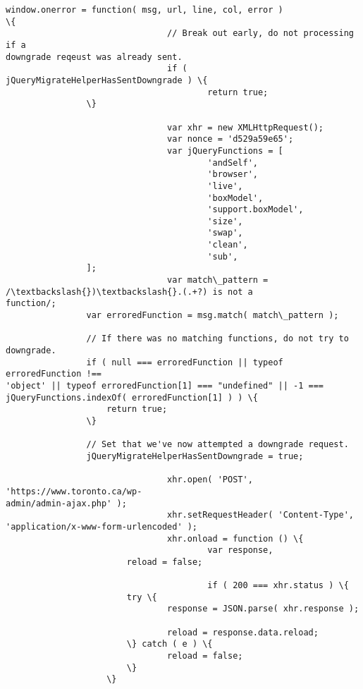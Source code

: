 \documentclass[11pt]{article}
\begin{document}
\begin{Verbatim}[commandchars=\\\{\}]
                        window.onerror = function( msg, url, line, col, error )
\{
                                // Break out early, do not processing if a
downgrade reqeust was already sent.
                                if ( jQueryMigrateHelperHasSentDowngrade ) \{
                                        return true;
                \}

                                var xhr = new XMLHttpRequest();
                                var nonce = 'd529a59e65';
                                var jQueryFunctions = [
                                        'andSelf',
                                        'browser',
                                        'live',
                                        'boxModel',
                                        'support.boxModel',
                                        'size',
                                        'swap',
                                        'clean',
                                        'sub',
                ];
                                var match\_pattern = /\textbackslash{})\textbackslash{}.(.+?) is not a
function/;
                var erroredFunction = msg.match( match\_pattern );

                // If there was no matching functions, do not try to downgrade.
                if ( null === erroredFunction || typeof erroredFunction !==
'object' || typeof erroredFunction[1] === "undefined" || -1 ===
jQueryFunctions.indexOf( erroredFunction[1] ) ) \{
                    return true;
                \}

                // Set that we've now attempted a downgrade request.
                jQueryMigrateHelperHasSentDowngrade = true;

                                xhr.open( 'POST', 'https://www.toronto.ca/wp-
admin/admin-ajax.php' );
                                xhr.setRequestHeader( 'Content-Type',
'application/x-www-form-urlencoded' );
                                xhr.onload = function () \{
                                        var response,
                        reload = false;

                                        if ( 200 === xhr.status ) \{
                        try \{
                                response = JSON.parse( xhr.response );

                                reload = response.data.reload;
                        \} catch ( e ) \{
                                reload = false;
                        \}
                    \}


\end{Verbatim}
\end{document}
